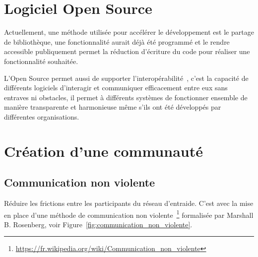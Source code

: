 \section{Logiciel Open Source}
Actuellement, une méthode utilisée pour accélérer le développement est le partage de bibliothèque, une fonctionnalité aurait déjà été programmé et le rendre accessible publiquement permet la réduction d’écriture du code pour réaliser une fonctionnalité souhaitée.

L’Open Source permet aussi de supporter l'interopérabilité~\cite{open_interop_2011}, c’est la capacité de différents logiciels d'interagir et communiquer efficacement entre eux sans entraves ni obstacles, il permet à différents systèmes de fonctionner ensemble de manière transparente et harmonieuse même s’ils ont été développés par différentes organisations.





\section{Création d’une communauté}

\subsection{Communication non violente}

Réduire les frictions entre les participants du réseau d’entraide. C’est avec la mise en place d’une méthode de communication non violente~\footnote{\url{https://fr.wikipedia.org/wiki/Communication_non_violente}} formalisée par Marshall B. Rosenberg, voir Figure~\ref{fig:communication_non_violente}.

